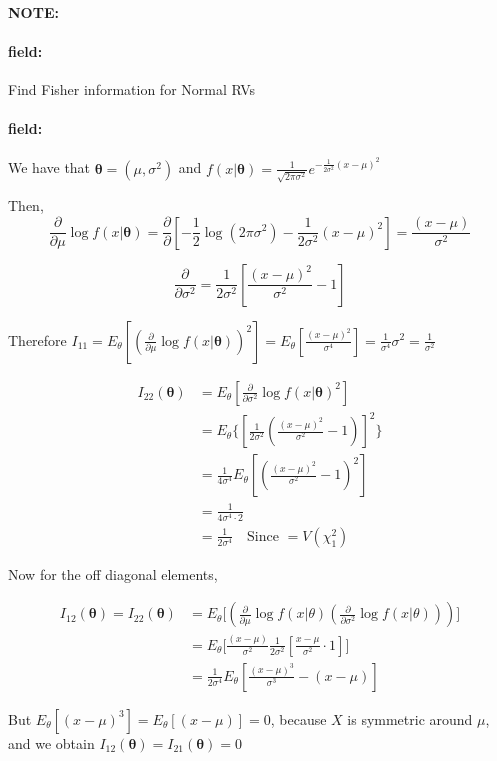 \documentclass[12pt]{article}
\newenvironment{note}{\paragraph{NOTE:}}{}
\newenvironment{field}{\paragraph{field:}}{}
\begin{document}
\begin{note}
  \begin{field}
    Find Fisher information for Normal RVs
  \end{field}
  \begin{field}
    We have that $\boldsymbol\theta = (\mu,\sigma^2)$ and $f(x|\boldsymbol\theta) = \frac{1}{\sqrt{2\pi\sigma^2}}e^{-\frac{1}{2\sigma^2}(x - \mu)^2}$

    Then,
    $$ \frac{\partial}{\partial \mu} \log f(x|\boldsymbol\theta) = \frac{\partial}{\partial}[-\frac{1}{2}\log(2\pi\sigma^2) - \frac{1}{2\sigma^2}(x - \mu)^2] = \frac{(x-\mu)}{\sigma^2}$$

    $$ \frac{\partial}{\partial\sigma^2} = \frac{1}{2\sigma^2}[ \frac{(x-\mu)^2}{\sigma^2} - 1]$$

    Therefore $I_{11} = E_\theta[(\frac{\partial}{\partial \mu}\log f(x|\boldsymbol\theta))^2] = E_\theta[\frac{(x-\mu)^2}{\sigma^4}] = \frac{1}{\sigma^4}\sigma^2 = \frac{1}{\sigma^2}$

    \begin{align*}
      I_{22}(\boldsymbol\theta) &= E_{\theta}[\frac{\partial}{\partial\sigma^2}\log f(x|\boldsymbol\theta)^2]\\
      &= E_\theta \big\{ [ \frac{1}{2\sigma^2} ( \frac{(x-\mu)^2}{\sigma^2} - 1)]^2\big\}\\
      &= \frac{1}{4\sigma^4}E_\theta[ (\frac{(x-\mu)^2}{\sigma^2} - 1)^2]\\
      &= \frac{1}{4\sigma^4 \cdot 2} \\
      &= \frac{1}{2\sigma^4} \quad \text{Since } = V(\chi^2_1)
    \end{align*}

    Now for the off diagonal elements,

    \begin{align*}
      I_{12}(\boldsymbol\theta) = I_{22}(\boldsymbol\theta) &= E_\theta \big[ ( \frac{\partial{}{}}{\partial{\mu}{}}\log f(x|\theta)(\frac{\partial{}{}}{\partial{\sigma^2}{    }} \log f(x|\theta)))\big]\\
      &=E_\theta \big[ \frac{(x-\mu)}{\sigma^2
      } \frac{1}{2\sigma^2} [\frac{x-\mu}{\sigma^2}\cdot 1]\big]\\
      &= \frac{1}{2\sigma^4} E_\theta[ \frac{(x-\mu)^3}{\sigma^3} - (x-\mu)]
    \end{align*}

    But $E_\theta[(x-\mu)^3] = E_\theta[(x - \mu)] = 0$, because $X$ is symmetric around $\mu$, and we obtain $I_{12}(\boldsymbol\theta) = I_{21}(\boldsymbol\theta) = 0$


\end{field}
\end{note}
\end{document}
